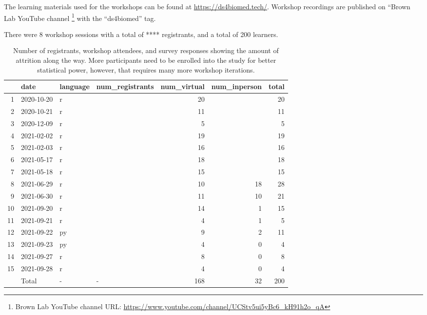 \documentclass[030-workshop.tex]{subfiles}
\begin{document}
    The learning materials used for the workshops can be found at
    \url{https://ds4biomed.tech/}.
    Workshop recordings are published on ``Brown Lab YouTube channel
    \footnote{Brown Lab YouTube channel URL: \url{https://www.youtube.com/channel/UCStv5ui5yBc6_kH91h2o_qA}}
    with the ``ds4biomed'' tag.

    There were 8 workshop sessions with a total of **** registrants,
    and a total of 200 learners.

    \begin{table}[ht]
        \centering
        \caption[Workshop Registration and Survey Counts]
            {Number of registrants, workshop attendees, and survey responses showing the amount of attrition along the way.
             More participants need to be enrolled into the study for better statistical power,
             however, that requires many more workshop iterations.
            }
        \begin{tabular}{rlllrrr}
            \hline
            & date & language & num\_registrants & num\_virtual & num\_inperson & total \\
            \hline
            1 & 2020-10-20 & r &  &  20 &  &  20 \\
            2 & 2020-10-21 & r &  &  11 &  &  11 \\
            3 & 2020-12-09 & r &  &   5 &  &   5 \\
            4 & 2021-02-02 & r &  &  19 &  &  19 \\
            5 & 2021-02-03 & r &  &  16 &  &  16 \\
            6 & 2021-05-17 & r &  &  18 &  &  18 \\
            7 & 2021-05-18 & r &  &  15 &  &  15 \\
            8 & 2021-06-29 & r &  &  10 &  18 &  28 \\
            9 & 2021-06-30 & r &  &  11 &  10 &  21 \\
            10 & 2021-09-20 & r &  &  14 &   1 &  15 \\
            11 & 2021-09-21 & r &  &   4 &   1 &   5 \\
            12 & 2021-09-22 & py &  &   9 &   2 &  11 \\
            13 & 2021-09-23 & py &  &   4 &   0 &   4 \\
            14 & 2021-09-27 & r &  &   8 &   0 &   8 \\
            15 & 2021-09-28 & r &  &   4 &   0 &   4 \\
               & Total & - & - & 168 &  32 & 200 \\
        \hline
    \end{tabular}
    \label{tab:workshop-counts}
    \end{table}
\end{document}
